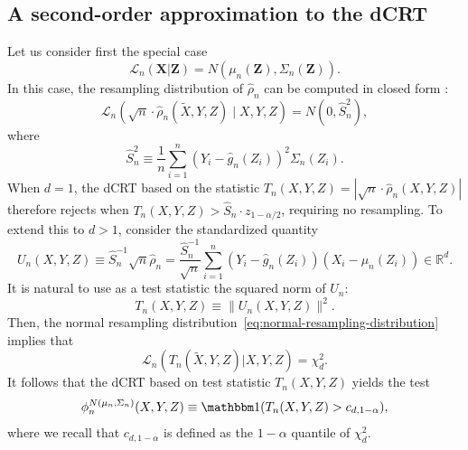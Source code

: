\documentclass[12pt]{article}
\theoremstyle{definition}
\theoremstyle{remark}
\newcommand{\prx}{\bm X}
\newcommand{\srx}{X}
\newcommand{\prz}{\bm Z}
\newcommand{\srz}{Z}
\newcommand{\srxk}{\widetilde X}
\newcommand{\sry}{Y}
\begin{document}
\subsection{A second-order approximation to the dCRT} \label{sec:second-order-approx}

Let us consider first the special case
\begin{equation}
\mathcal L_n(\prx | \prz) = N(\mu_n(\prz), \Sigma_n(\prz)).
\label{eq:normal-conditional}
\end{equation}
In this case, the resampling distribution of $\widehat \rho_n$ can be computed in closed form \cite{Liu2020}:
\begin{equation}
\mathcal L_n(\sqrt n \cdot \widehat \rho_n(\srxk, \sry, \srz) \mid \srx, \sry, \srz) = N(0, \widehat S_n^2),
\label{eq:normal-resampling-distribution}
\end{equation}
where
\begin{equation}
	\widehat S_n^2 \equiv \frac{1}{n}\sum_{i = 1}^n (\sry_{i} - \widehat g_n(\srz_{i}))^2\Sigma_n(\srz_i).
	\label{eq:s-n-hat}
\end{equation}
When $d = 1$, the dCRT based on the statistic $T_n(\srx, \sry, \srz) = |\sqrt n \cdot \widehat \rho_n(\srx, \sry, \srz)|$ therefore rejects when $T_n(\srx, \sry, \srz) > \widehat S_n \cdot z_{1-\alpha/2}$, requiring no resampling. To extend this to $d > 1$, consider the standardized quantity
\begin{equation}
U_n(\srx, \sry, \srz) \equiv \widehat S_n^{-1} \sqrt{n} \widehat \rho_n = \frac{\widehat S_n^{-1}}{\sqrt{n}}\sum_{i = 1}^n (\sry_{i} - \widehat g_n(\srz_{i}))(\srx_{i} - \mu_n(\srz_i)) \in \mathbb R^d.
\label{u-hat}
\end{equation}
It is natural to use as a test statistic the squared norm of $U_n$:
\begin{equation}
	T_n(\srx, \sry, \srz) \equiv \|U_n(\srx, \sry, \srz)\|^2.
	\label{t-n}
\end{equation}
Then, the normal resampling distribution~\eqref{eq:normal-resampling-distribution} implies that
\begin{equation}
\mathcal L_n(T_n(\srxk, \sry, \srz)|\srx, \sry, \srz) = \chi^2_d.
\end{equation}
It follows that the dCRT based on test statistic $T_n(\srx, \sry, \srz)$ yields the test
\begin{equation}
\phi^{N(\mu_n, \Sigma_n)}_n(\srx, \sry, \srz) \equiv \mathbbm 1(T_n(\srx, \sry, \srz) > c_{d,1-\alpha}),
\label{eq:crt-closed-form}
\end{equation}
where we recall that $c_{d,1-\alpha}$ is defined as the $1-\alpha$ quantile of $\chi^2_d$. 
\end{document}
